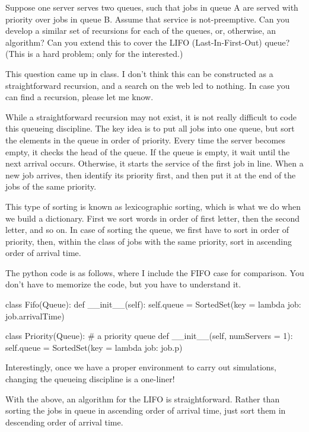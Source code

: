 \begin{exercise} Suppose one server serves two
  queues, such that jobs in queue A are served with priority over jobs
  in queue B. Assume that service is not-preemptive.  Can you develop
  a similar set of recursions for each of the queues, or, otherwise,
  an algorithm? Can you extend this to cover the LIFO (Last-In-First-Out) queue?
(This is  a hard problem; only for the interested.)
  \begin{solution}
    This question came up in class. I don't think this can be
    constructed as a straightforward recursion, and a search on the
    web led to nothing. In case you can find a recursion, please let
    me know.  

    While a straightforward recursion may not exist, it is not really
    difficult to code this queueing discipline. The key idea is to put
    all jobs into one queue, but sort the elements in the queue in
    order of priority. Every time the server becomes empty, it checks
    the head of the queue. If the queue is empty, it wait until the
    next arrival occurs. Otherwise, it starts the service of the first
    job in line. When a new job arrives, then identify its priority
    first, and then put it at the end of the jobs of the same
    priority.

    This type of sorting is known as lexicographic sorting, which is
    what we do when we build a dictionary. First we sort words in
    order of first letter, then the second letter, and so on. In case
    of sorting the queue, we first have to sort in order of priority,
    then, within the class of jobs with the same priority, sort in
    ascending order of arrival time.

    The python code is as follows, where I include the FIFO case for
    comparison. You don't have to memorize the code, but you have to understand it. 

\begin{pyverbatim}
class Fifo(Queue):
    def __init__(self):
        self.queue = SortedSet(key = lambda job: job.arrivalTime)

class Priority(Queue): # a priority queue
    def __init__(self, numServers = 1):
        self.queue = SortedSet(key = lambda job: job.p)
\end{pyverbatim}

Interestingly, once we have a proper environment to carry out
simulations, changing the queueing discipline is a one-liner!

With the above, an algorithm for the LIFO is
    straightforward. Rather than sorting the jobs in queue in
    ascending order of arrival time, just sort them in descending
    order of arrival time. 


\end{solution}
\end{exercise}
